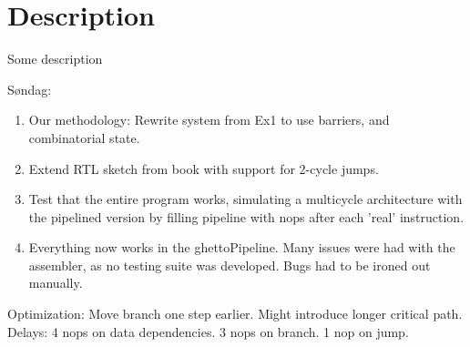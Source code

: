 \section{Description}

Some description

Søndag:

\begin{enumerate}
  \item Our methodology: Rewrite system from Ex1 to use barriers, and combinatorial state.
  \item Extend RTL sketch from book with support for 2-cycle jumps.
  \item Test that the entire program works, simulating a multicycle architecture with the pipelined version by filling pipeline with nops after each 'real' instruction.
  \item Everything now works in the ghettoPipeline. Many issues were had with the assembler, as no testing suite was developed. Bugs had to be ironed out manually.
\end{enumerate}

Optimization: Move branch one step earlier. Might introduce longer critical path.
Delays: 4 nops on data dependencies. 3 nops on branch. 1 nop on jump.
